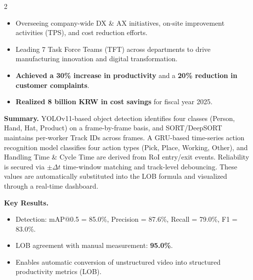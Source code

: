 \documentclass[10pt,a4paper,withhyper]{altacv}
\begin{document}


\makecvheader


\begin{paracol}{2}



\begin{itemize}
  \item Overseeing company-wide DX \& AX initiatives, on-site improvement activities (TPS), and cost reduction efforts.
  \item Leading 7 Task Force Teams (TFT) across departments to drive manufacturing innovation and digital transformation.
  \item \textbf{Achieved a 30\% increase in productivity} and a \textbf{20\% reduction in customer complaints}.
  \item \textbf{Realized 8 billion KRW in cost savings} for fiscal year 2025.
\end{itemize}



\smallskip
\textbf{Summary.} YOLOv11-based object detection identifies four classes (Person, Hand, Hat, Product) on a frame-by-frame basis, and SORT/DeepSORT maintains per-worker Track IDs across frames. A GRU-based time-series action recognition model classifies four action types (Pick, Place, Working, Other), and Handling Time \& Cycle Time are derived from RoI entry/exit events. Reliability is secured via $\pm\Delta t$ time-window matching and track-level debouncing. These values are automatically substituted into the LOB formula and visualized through a real-time dashboard.

\smallskip
\textbf{Key Results.}
\begin{itemize}
  \item Detection: mAP@0.5 = 85.0\%, Precision = 87.6\%, Recall = 79.0\%, F1 = 83.0\%.
  \item LOB agreement with manual measurement: \textbf{95.0\%}.
  \item Enables automatic conversion of unstructured video into structured productivity metrics (LOB).
\end{itemize}


\end{paracol}
\end{document}
